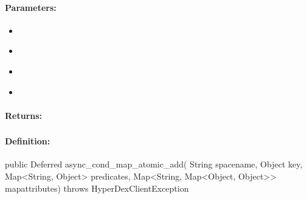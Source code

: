 \paragraph{Parameters:}
\begin{itemize}[noitemsep]
\item {}\\

\item {}\\

\item {}\\

\item {}\\

\end{itemize}

\paragraph{Returns:}


\pagebreak
\subsubsection{}
\label{api:java:async_cond_map_atomic_add}


\paragraph{Definition:}
\begin{javacode}
public Deferred async_cond_map_atomic_add(
        String spacename,
        Object key,
        Map<String, Object> predicates,
        Map<String, Map<Object, Object>> mapattributes) throws HyperDexClientException
\end{javacode}

